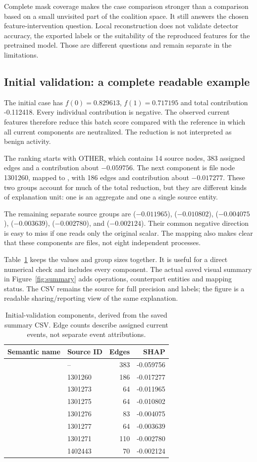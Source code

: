 \documentclass[11pt,a4paper]{article}
\newcommand{\code}[1]{\texttt{\detokenize{#1}}}
\newcommand{\InitialReference}{0.829613}
\newcommand{\InitialOriginal}{0.717195}
\newcommand{\InitialSum}{-0.112418}
\newcommand{\InitialSemanticRowsEN}{
\code{OTHER (14 sources)} & -- & 383 & -0.059756 \\
\code{/proc/stat} & 1301260 & 186 & -0.017277 \\
\code{/proc/1486/net/sockstat} & 1301273 & 64 & -0.011965 \\
\code{/proc/1486/net/arp} & 1301275 & 64 & -0.010802 \\
\code{/proc/loadavg} & 1301276 & 83 & -0.004075 \\
\code{/proc/1486/net/dev} & 1301277 & 64 & -0.003639 \\
\code{/proc/meminfo} & 1301271 & 110 & -0.002780 \\
\code{/proc/1350/stat} & 1402443 & 70 & -0.002124 \\}
\begin{document}
Complete mask coverage makes the case comparison stronger than a comparison
based on a small unvisited part of the coalition space. It still answers the
chosen feature-intervention question. Local reconstruction does not validate
detector accuracy, the exported labels or the suitability of the reproduced
features for the pretrained model. Those are different questions and remain
separate in the limitations.

\subsection{Initial validation: a complete readable example}
The initial case has $f(0)=\InitialReference$, $f(1)=\InitialOriginal$ and total
contribution \InitialSum{}. Every individual contribution is negative. The
observed current features therefore reduce this batch score compared with the
reference in which all current components are neutralized. The reduction is not interpreted
as benign activity.

The ranking starts with OTHER, which contains 14 source nodes, 383 assigned
edges and a contribution about $-0.059756$. The next component is file node
1301260, mapped to , with 186 edges and contribution about
$-0.017277$. These two groups account for much of the total reduction, but they
are different kinds of explanation unit: one is an aggregate and one a single
source entity.

The remaining separate source groups are 
($-0.011965$),  ($-0.010802$), 
($-0.004075$),  ($-0.003639$), 
($-0.002780$), and  ($-0.002124$). Their common negative
direction is easy to miss if one reads only the original scalar. The mapping
also makes clear that these components are files, not eight independent
processes.

Table~\ref{tab:initial} keeps the values and group sizes together. It is useful
for a direct numerical check and includes every component. The actual saved
visual summary in Figure~\ref{fig:summary} adds operations, counterpart entities
and mapping status. The CSV remains the source for full precision and labels;
the figure is a readable sharing/reporting view of the same explanation.

\begin{table}[htbp]
\centering\small
\setlength{\tabcolsep}{5pt}
\begin{tabular}{@{}llrr@{}}
\toprule
Semantic name & Source ID & Edges & SHAP\\
\midrule
\InitialSemanticRowsEN
\bottomrule
\end{tabular}
\caption{Initial-validation components, derived from the saved summary CSV.
Edge counts describe assigned current events, not separate event attributions.}
\label{tab:initial}
\end{table}
\end{document}

